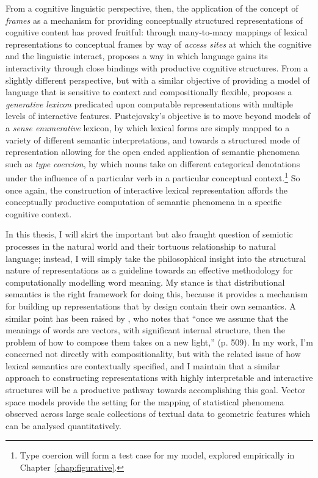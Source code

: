 From a cognitive linguistic perspective, then, the application of the concept of \emph{frames} \citep{Barsalou1992} as a mechanism for providing conceptually structured representations of cognitive content has proved fruitful: through many-to-many mappings of lexical representations to conceptual frames by way of \emph{access sites} at which the cognitive and the linguistic interact, \cite{Evans2009} proposes a way in which language gains its interactivity through close bindings with productive cognitive structures.  From a slightly different perspective, but with a similar objective of providing a model of language that is sensitive to context and compositionally flexible, \cite{Pustejovsky1995} proposes a \emph{generative lexicon} predicated upon computable representations with multiple levels of interactive features.  Pustejovsky's objective is to move beyond models of a \emph{sense enumerative} lexicon, by which lexical forms are simply mapped to a variety of different semantic interpretations, and towards a structured mode of representation allowing for the open ended application of semantic phenomena such as \emph{type coercion}, by which nouns take on different categorical denotations under the influence of a particular verb in a particular conceptual context.\footnote{Type coercion will form a test case for my model, explored empirically in Chapter~\ref{chap:figurative}.}  So once again, the construction of interactive lexical representation affords the conceptually productive computation of semantic phenomena in a specific cognitive context.

In this thesis, I will skirt the important but also fraught question of semiotic processes in the natural world and their tortuous relationship to natural language; instead, I will simply take the philosophical insight into the structural nature of representations as a guideline towards an effective methodology for computationally modelling word meaning.  My stance is that distributional semantics is the right framework for doing this, because it provides a mechanism for building up representations that by design contain their own semantics.  A similar point has been raised by \cite{Clark2015}, who notes that ``once we assume that the meanings of words are vectors, with significant internal structure, then the problem of how to compose them takes on a new light,'' (p. 509).  In my work, I'm concerned not directly with compositionality, but with the related issue of how lexical semantics are contextually specified, and I maintain that a similar approach to constructing representations with highly interpretable and interactive structures will be a productive pathway towards accomplishing this goal.  Vector space models provide the setting for the mapping of statistical phenomena observed across large scale collections of textual data to geometric features which can be analysed quantitatively.

